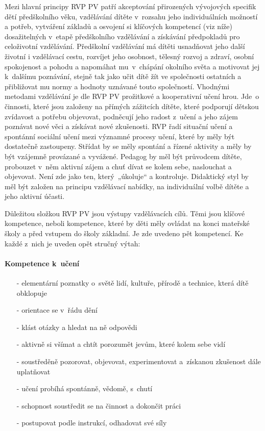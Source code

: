 				Mezi hlavní principy RVP PV patří akceptování přirozených vývojových specifik dětí předškolního věku, vzdělávání dítěte v rozsahu jeho individuálních možností a potřeb, vytváření základů a osvojení si klíčových kompetencí (viz níže) dosažitelných v etapě předškolního vzdělávání a získávání předpokladů pro celoživotní vzdělávání.
				Předškolní vzdělávání má dítěti usnadňovat jeho další životní i vzdělávací cestu, rozvíjet jeho osobnost, tělesný rozvoj a zdraví, osobní spokojenost a pohodu a napomáhat mu v chápání okolního světa a motivovat jej k dalšímu poznávání, stejně tak jako učit dítě žít ve společnosti ostatních a přibližovat mu normy a hodnoty uznávané touto společností.
				Vhodnými metodami vzdělávání je dle RVP PV prožitkové a kooperativní učení hrou. Jde o činnosti, které jsou založeny na přímých zážitcích dítěte, které podporují dětskou zvídavost a potřebu objevovat, podněcují jeho radost z učení a jeho zájem poznávat nové věci a získávat nové zkušenosti.
				RVP řadí situační učení a spontánní sociální učení mezi významné procesy učení, které by měly být dostatečně zastoupeny. Střídat by se měly spontání a řízené aktivity a měly by být vzájemně provázané a vyvážené. Pedagog by měl být průvodcem dítěte, probouzet v něm aktivní zájem a chuť dívat se kolem sebe, naslouchat a objevovat. Není zde jako ten, který „úkoluje“ a kontroluje. Didaktický styl by měl být založen na principu vzdělávací nabídky, na individuální volbě dítěte a jeho aktivní účasti.
				

				Důležitou složkou RVP PV jsou výstupy vzdělávacích cílů. Těmi jsou klíčové kompetence, neboli kompetence, které by děti měly ovládat na konci mateřské školy a před vstupem do školy základní. Je zde uvedeno pět kompetencí. Ke každé z nich je uveden opět stručný výtah:

				\paragraph{Kompetence k učení}
				\begin{itemize}
				\setlength\itemsep{-2mm}
				\item[-] elementární poznatky o~světě lidí, kultuře, přírodě a technice, která dítě obklopuje
				\item[-] orientace se v řádu dění
				\item[-] klást otázky a hledat na ně odpovědi
				\item[-] aktivně si všímat a chtít porozumět jevům, které kolem sebe vidí
				\item[-] soustředěně pozorovat, objevovat, experimentovat a získanou zkušenost dále uplatňovat
				\item[-] učení probíhá spontánně, vědomě, s~chutí
				\item[-] schopnost soustředit se na činnost a dokončit práci
				\item[-] postupovat podle instrukcí, odhadovat své síly 
				\end{itemize}
				

